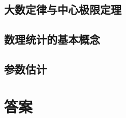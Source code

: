 \documentclass[lang=cn,newtx,10pt,scheme=chinese]{elegantbook}
\begin{document}
\section{大数定律与中心极限定理}

\section{数理统计的基本概念}

\section{参数估计}

\nocite{*}

\printbibliography[heading=bibintoc, title=\ebibname]
\appendix
\chapter{答案}
\end{document}
